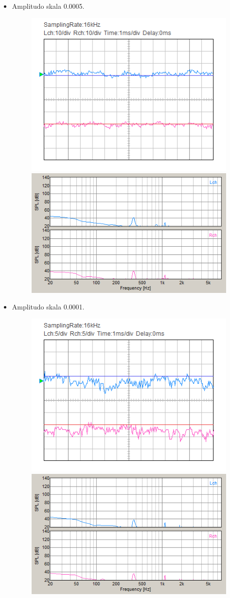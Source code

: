 \documentclass[12pt,]{article}
\begin{document}
\begin{itemize}
\begin{itemize}
\begin{itemize}
			\item Amplitudo skala 0.0005.
			\begin{figure}[H]
				\centering
				\includegraphics[width=0.45\linewidth]{result/day_3/400_Hz/osi_tone00005}
				\includegraphics[width=0.45\linewidth]{result/day_3/400_Hz/fft_tone00005}
			\end{figure}
		
			\newpage
			\item Amplitudo skala 0.0001.
			\begin{figure}[H]
				\centering
				\includegraphics[width=0.45\linewidth]{result/day_3/400_Hz/osi_tone00001}
				\includegraphics[width=0.45\linewidth]{result/day_3/400_Hz/fft_tone00001}
			\end{figure}
		

\end{itemize}
\end{itemize}
\end{itemize}
\end{document}
